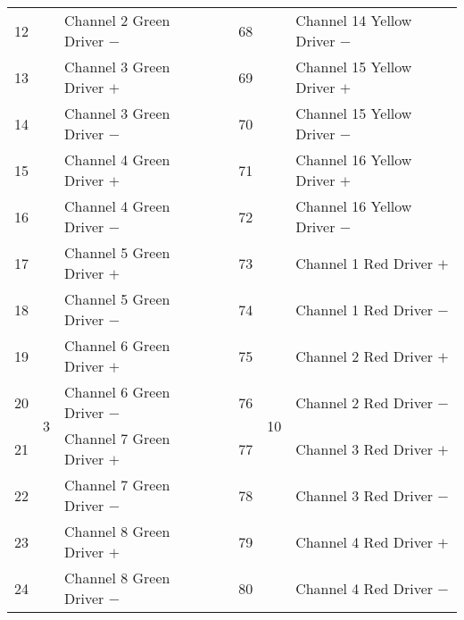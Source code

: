 \documentclass[]{article}
\begin{document}
\begin{table}[]
\begin{tabular}{@{}lllllll@{}}
		12           &                    & Channel 2 Green Driver $-$    &                   & 68           &                     & Channel 14 Yellow Driver $-$ \\
		13           &                    & Channel 3 Green Driver $+$    &                   & 69           &                     & Channel 15 Yellow Driver $+$ \\
		14           &                    & Channel 3 Green Driver $-$    &                   & 70           &                     & Channel 15 Yellow Driver $-$ \\
		15           &                    & Channel 4 Green Driver $+$    &                   & 71           &                     & Channel 16 Yellow Driver $+$ \\
		16           &                    & Channel 4 Green Driver $-$    &                   & 72           &                     & Channel 16 Yellow Driver $-$ \\ \cmidrule(r){1-3} \cmidrule(l){5-7} 
		17           & \multirow{8}{*}{3} & Channel 5 Green Driver $+$    &                   & 73           & \multirow{8}{*}{10} & Channel 1 Red Driver $+$     \\
		18           &                    & Channel 5 Green Driver $-$    &                   & 74           &                     & Channel 1 Red Driver $-$     \\
		19           &                    & Channel 6 Green Driver $+$    &                   & 75           &                     & Channel 2 Red Driver $+$     \\
		20           &                    & Channel 6 Green Driver $-$    &                   & 76           &                     & Channel 2 Red Driver $-$     \\
		21           &                    & Channel 7 Green Driver $+$    &                   & 77           &                     & Channel 3 Red Driver $+$     \\
		22           &                    & Channel 7 Green Driver $-$    &                   & 78           &                     & Channel 3 Red Driver $-$     \\
		23           &                    & Channel 8 Green Driver $+$    &                   & 79           &                     & Channel 4 Red Driver $+$     \\
		24           &                    & Channel 8 Green Driver $-$    &                   & 80           &                     & Channel 4 Red Driver $-$     \\ \cmidrule(r){1-3} \cmidrule(l){5-7} 

\end{tabular}
\end{table}
\end{document}
